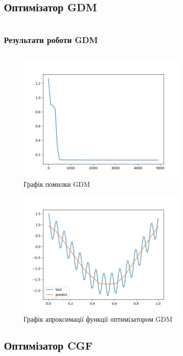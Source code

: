 \documentclass[a4paper,14pt]{extarticle}
\begin{document}
\subsection{Оптимізатор GDM}
\inputminted[breaklines,linenos=true]{python}{gdm.py}

\subsubsection{Результати роботи GDM}
\inputminted[breaklines,linenos=true]{text}{output_gdm.txt}

\begin{figure}[H]
    \centering
    \includegraphics[width=0.75\textwidth]{gdm_loss.png}
    \caption{Графік помилки GDM}
\end{figure}
\begin{figure}[H]
    \centering
    \includegraphics[width=0.75\textwidth]{gdm_func.png}
    \caption{Графік апроксимації функції оптимізатором GDM}
\end{figure}

\subsection{Оптимізатор CGF}
\inputminted[breaklines,linenos=true]{python}{cfg.py}
\end{document}
